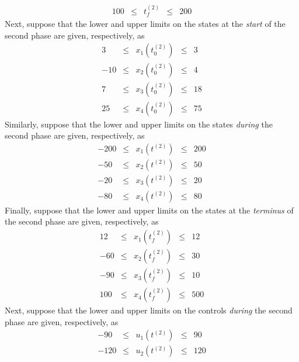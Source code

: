 \documentclass[10pt]{article}
\newenvironment{shadedframe}{%
  \def\FrameCommand{\fcolorbox{black}{shadecolor}}%
  \MakeFramed {\FrameRestore}}
{\endMakeFramed}
\begin{document}
\begin{shadedframe}
\begin{displaymath}
\begin{array}{rcccr}
   100 & \leq & t_f^{(2)} & \leq & 200
 \end{array}
\end{displaymath}
Next, suppose that the lower and upper limits on the states at the
{\em start} of the second phase are given, respectively, as
\begin{displaymath}
 \begin{array}{rcccr}
    3 & \leq & x_1(t_0^{(2)}) & \leq & 3 \\
   -10 & \leq & x_2(t_0^{(2)}) & \leq & 4 \\
   7 & \leq & x_3(t_0^{(2)}) & \leq & 18 \\
  25 & \leq & x_4(t_0^{(2)}) & \leq & 75
 \end{array}
\end{displaymath}
Similarly, suppose that the lower and upper limits on the states
{\em during} the second phase are given, respectively, as
\begin{displaymath}
 \begin{array}{rcccr}
   -200 & \leq & x_1(t^{(2)}) & \leq & 200 \\
   -50 & \leq & x_2(t^{(2)}) & \leq & 50 \\
   -20 & \leq & x_3(t^{(2)}) & \leq & 20 \\
   -80 & \leq & x_4(t^{(2)}) & \leq & 80
 \end{array}
\end{displaymath}
Finally, suppose that the lower and upper limits on the states at the
{\em terminus} of the second phase are given, respectively, as
\begin{displaymath}
 \begin{array}{rcccr}
   12 & \leq & x_1(t_f^{(2)}) & \leq & 12 \\
   -60 & \leq & x_2(t_f^{(2)}) & \leq & 30 \\
   -90 & \leq & x_3(t_f^{(2)}) & \leq & 10 \\
  100 & \leq & x_4(t_f^{(2)}) & \leq & 500
 \end{array}
\end{displaymath}
Next, suppose that the lower and upper limits on the controls
{\em during} the second phase are given, respectively, as
\begin{displaymath}
 \begin{array}{rcccr}
   -90 & \leq & u_1(t^{(2)}) & \leq & 90 \\
   -120 & \leq & u_2(t^{(2)})& \leq & 120
 \end{array}
\end{displaymath}

\end{shadedframe}
\end{document}
